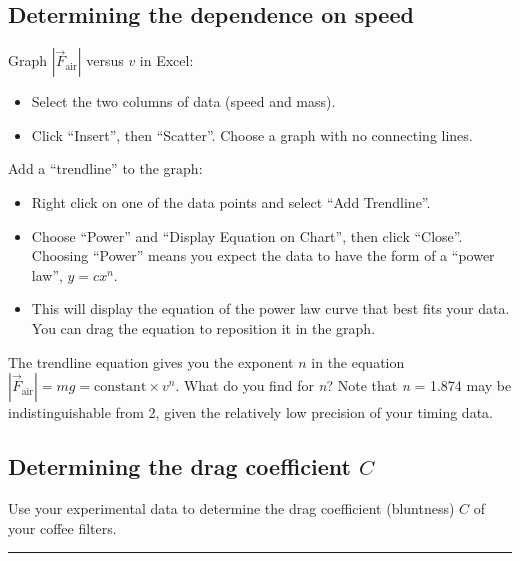 \documentclass[11pt]{article}
\begin{document}
\vspace*{-8pt}
\subsection{Determining the dependence on speed}

\begin{compactitem}[\color{MIRed}$\Rightarrow$]
\item Graph $\left|\vec{F}_{ \text{air}}\right|$ versus $v$ in Excel:
\begin{itemize}
\item Select the two columns of data (speed and mass).
\item Click ``Insert'', then ``Scatter''. Choose a graph with no connecting lines.
\end{itemize}
\item Add a ``trendline'' to the graph:
\begin{itemize}
\item Right click on one of the data points and select ``Add Trendline''.
\item Choose ``Power'' and ``Display Equation on Chart'', then click ``Close''. Choosing ``Power'' means you expect the data to have the form of a ``power law'', $y = cx^n$.
\item This will display the equation of the power law curve that best fits your data. You can drag the equation to reposition it in the graph.
\end{itemize}
\end{compactitem}

The trendline equation gives you the exponent $n$ in the equation $\left|\vec{F}_{ \text{air}}\right| = mg = \mathrm{constant} \times v^n$. What do you find for \textit{n}? Note that \textit{n} = 1.874 may be indistinguishable from 2, given the relatively low precision of your timing data.

\vspace*{-8pt}
\subsection{Determining the drag coefficient $C$}

\begin{compactitem}[\color{MIRed}$\Rightarrow$]
\item Use your experimental data to determine the drag coefficient (bluntness) $C$ of your coffee filters.
\end{compactitem}

\vspace{20pt}
\hrule

\bigskip 
{}

\vfill
\end{document}

